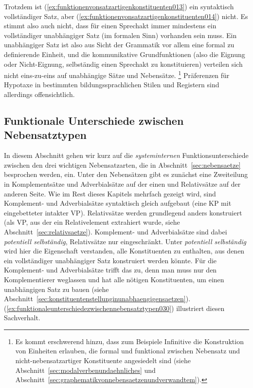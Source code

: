 Trotzdem ist (\ref{ex:funktionenvonsatzartigenkonstituenten013}) ein syntaktisch vollständiger Satz, aber (\ref{ex:funktionenvonsatzartigenkonstituenten014}) nicht.
Es stimmt also auch nicht, dass für einen Sprechakt immer mindestens ein vollständiger unabhängiger Satz (im formalen Sinn) vorhanden sein muss.
Ein unabhängiger Satz ist also aus Sicht der Grammatik vor allem eine formal zu definierende Einheit, und die kommunikative Grundfunktionen (also die Eignung oder Nicht-Eignung, selbständig einen Sprechakt zu konstituieren) verteilen sich nicht eins-zu-eins auf unabhängige Sätze und Nebensätze.%
\footnote{Es kommt erschwerend hinzu, dass zum Beispiele Infinitive die Konstruktion von Einheiten erlauben, die formal und funktional zwischen Nebensatz und nicht-nebensatzartiger Konstituente angesiedelt sind (siehe Abschnitt~\ref{sec:modalverbenundaehnliches} und Abschnitt~\ref{sec:graphematikvonnebensaetzenundverwandtem}).}
Präferenzen für Hypotaxe in bestimmten bildungssprachlichen Stilen und Registern sind allerdings offensichtlich.


\subsection{Funktionale Unterschiede zwischen Nebensatztypen}
\label{sec:funktionaleunterschiedezwischennebensatztypen}

In diesem Abschnitt gehen wir kurz auf die \textit{systeminternen} Funktionsunterschiede zwischen den drei wichtigen Nebensatzarten, die in Abschnitt~\ref{sec:nebensaetze} besprochen werden, ein.
Unter den Nebensätzen gibt es zunächst eine Zweiteilung in Komplementsätze und Adverbialsätze auf der einen und Relativsätze auf der anderen Seite.
Wie im Rest dieses Kapitels mehrfach gezeigt wird, sind Komplement- und Adverbialsätze syntaktisch gleich aufgebaut (eine KP mit eingebetteter intakter VP).
Relativsätze werden grundlegend anders konstruiert (als VP, aus der ein Relativelement extrahiert wurde, siehe Abschnitt~\ref{sec:relativsaetze}).
Komplement- und Adverbialsätze sind dabei \textit{potentiell selbständig}, Relativsätze nur eingeschränkt.
Unter \textit{potentiell selbständig} wird hier die Eigenschaft verstanden, alle Konstituenten zu enthalten, aus denen ein vollständiger unabhängiger Satz konstruiert werden könnte.
Für die Komplement- und Adverbialsätze trifft das zu, denn man muss nur den Komplementierer weglassen und hat alle nötigen Konstituenten, um einen unabhängigen Satz zu bauen (siehe Abschnitt~\ref{sec:konstituentenstellunginunabhaengigensaetzen}).
(\ref{ex:funktionaleunterschiedezwischennebensatztypen030}) illustriert diesen Sachverhalt.

